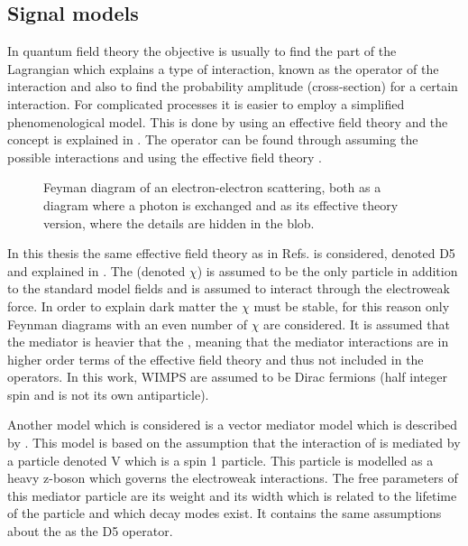 \subsection{Signal models}\label{sec:tb:subsec:eft}
In quantum field theory the objective is usually to find the part of the Lagrangian which explains a type of interaction, known as the operator of the interaction and also to find the probability amplitude (cross-section) for a certain interaction. For complicated processes it is easier to employ a simplified phenomenological model. This is done by using an effective field theory and the concept is explained in . The operator can be found through assuming the possible interactions and using the effective field theory \citep{Zee:2003}. 
 \begin{figure}[H] %
    \hfill
    \caption{Feyman diagram of an electron-electron scattering, both as a diagram where a photon is exchanged and as its effective theory version, where the details are hidden in the blob.}
    \label{fig:feymanc}
  \end{figure}
In this thesis the same effective field theory as in Refs. \citep{82.116010,Goodman:2010} is considered, denoted D5 and explained in . The \abbrWIMP (denoted $\chi$) is assumed to be the only particle in addition to the standard model fields and is assumed to interact through the electroweak force. In order to explain dark matter the \abbrWIMP $\chi$ must be stable, for this reason only Feynman diagrams with an even number of $\chi$ are considered. It is assumed that the mediator is heavier that the \abbrWIMPS, meaning that the mediator interactions are in higher order terms of the effective field theory and thus not included in the operators. In this work, WIMPS are assumed to be Dirac fermions (half integer spin and is not its own antiparticle). 

Another model which is considered is a vector mediator model which is described by . This model is based on the assumption that the interaction of \abbrWIMPS is mediated by a particle denoted V which is a spin 1 particle. This particle is modelled as a heavy z-boson which governs the electroweak interactions. The free parameters of this mediator particle are its weight and its width which is related to the lifetime of the particle and which decay modes exist. It contains the same assumptions about the \abbrWIMPS as the D5 operator.


